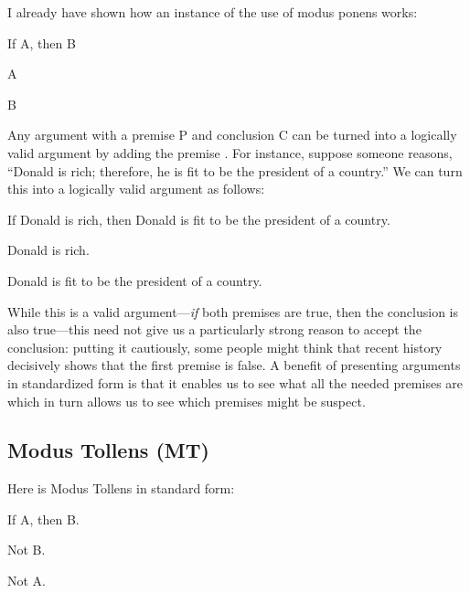 I already have shown how an instance of the use of modus ponens works:

\begin{argument*}

 \aitem If A, then B
 
 \aitem A

 \aitem B

\end{argument*}

Any argument with a premise P and conclusion C can be turned into a logically 
valid argument by adding the premise . For instance, suppose 
someone reasons, ``Donald is rich; therefore, he is fit to be the president of a 
country.'' We can turn this into a logically valid argument as follows:

\begin{argumentNamed*}[Argument 1]
\aitem If Donald is rich, then Donald is fit to be the president of a 
country.~~~

\aitem Donald is rich. 

\aitem Donald is fit to be the president of a country. 

\end{argumentNamed*}

While this is a valid argument---\emph{if} both premises are true, then the 
conclusion is also true---this need not give us a particularly strong reason to 
accept the conclusion: putting it cautiously, some people might think that 
recent history decisively shows that the first premise is false. A benefit of 
presenting arguments in standardized form is that it enables us to see what all 
the needed premises are which in turn allows us to see which premises might be 
suspect.

\subsection{Modus Tollens (MT)}

Here is Modus Tollens in standard form:

\begin{argument*}

 \aitem If A, then B. 

 \aitem Not B.

 \aitem Not A. 

\end{argument*}

